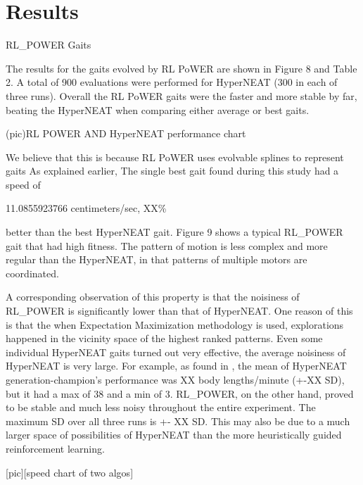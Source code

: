 \section{Results}

RL\_POWER Gaits

The results for the gaits evolved by RL PoWER are shown in Figure 8
and Table 2. A total of 900 evaluations were performed for HyperNEAT
(300 in each of three runs). Overall the RL PoWER gaits were the
faster and more stable by far, beating the HyperNEAT when comparing
either average or best gaits.

(pic)RL POWER AND HyperNEAT performance chart


We believe that this is because RL PoWER uses evolvable splines to represent gaits As explained earlier,  
The single best gait found during this study had a speed of

11.0855923766 centimeters/sec, XX\%

better than the best HyperNEAT gait. Figure 9 shows a typical
RL\_POWER gait that had high fitness. The pattern of motion is less
complex and more regular than the HyperNEAT, in that patterns of
multiple motors are coordinated.

A corresponding observation of this property is that the noisiness of
RL\_POWER is significantly lower than that of HyperNEAT. One reason of
this is that the when Expectation Maximization methodology is used,
explorations happened in the vicinity space of the highest ranked
patterns. Even some individual HyperNEAT gaits turned out very
effective, the average noisiness of HyperNEAT is very large. For
example, as found in \cite{yosinski2011evolving-robot-gaits}, the mean of HyperNEAT generation-champion’s
performance was XX body lengths/minute (+-XX SD), but it had a max of
38 and a min of 3. RL\_POWER, on the other hand, proved to be stable
and much less noisy throughout the entire experiment. The maximum SD
over all three runs is +- XX SD. This may also be due to a much larger
space of possibilities of HyperNEAT than the more heuristically guided
reinforcement learning.

[pic][speed chart of two algos]


